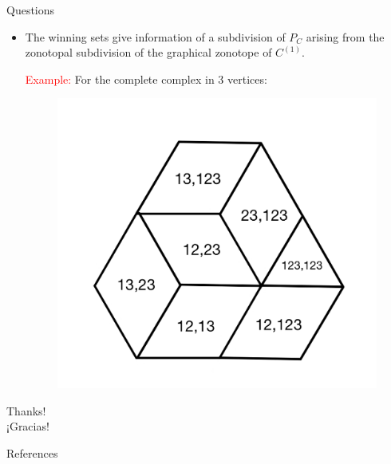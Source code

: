 \documentclass{beamer}
\begin{document}
\begin{frame}{Questions}
    \begin{itemize}
    \item The winning sets give information of a subdivision of $P_C$ arising from the zonotopal subdivision of the graphical zonotope of $C^{(1)}$.
    
    \pause
    \textcolor{red}{Example:} For the complete complex in 3 vertices:
    \begin{figure}
        \centering
        \includegraphics[scale=0.15]{images/P_C_3-subdivision-marked.png}
    \end{figure}
    \end{itemize}
\end{frame}

\begin{frame}
    \begin{center}
        \Huge Thanks! \\
    
        \Huge ¡Gracias!
    \end{center}
    
\end{frame}

\begin{frame}{References}
    \nocite{*}
    \printbibliography
\end{frame}
\end{document}
